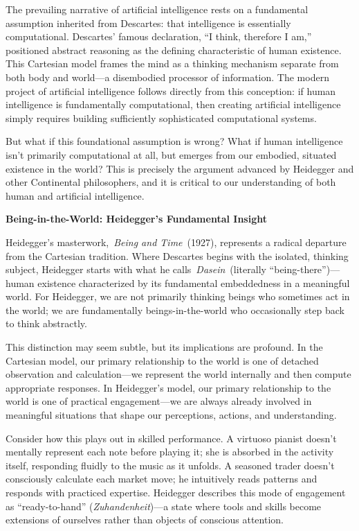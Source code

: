 \documentclass[
  Letterpaper,
]{scrbook}
\begin{document}
The prevailing narrative of artificial intelligence rests on a
fundamental assumption inherited from Descartes: that intelligence is
essentially computational. Descartes' famous declaration, ``I think,
therefore I am,'' positioned abstract reasoning as the defining
characteristic of human existence. This Cartesian model frames the mind
as a thinking mechanism separate from both body and world---a
disembodied processor of information. The modern project of artificial
intelligence follows directly from this conception: if human
intelligence is fundamentally computational, then creating artificial
intelligence simply requires building sufficiently sophisticated
computational systems.

But what if this foundational assumption is wrong? What if human
intelligence isn't primarily computational at all, but emerges from our
embodied, situated existence in the world? This is precisely the
argument advanced by Heidegger and other Continental philosophers, and
it is critical to our understanding of both human and artificial
intelligence.

\textbf{Being-in-the-World: Heidegger's Fundamental Insight}

Heidegger's masterwork,~\emph{Being and Time}~(1927), represents a
radical departure from the Cartesian tradition. Where Descartes begins
with the isolated, thinking subject, Heidegger starts with what he
calls~\emph{Dasein}~(literally ``being-there'')---human existence
characterized by its fundamental embeddedness in a meaningful world. For
Heidegger, we are not primarily thinking beings who sometimes act in the
world; we are fundamentally beings-in-the-world who occasionally step
back to think abstractly.

This distinction may seem subtle, but its implications are profound. In
the Cartesian model, our primary relationship to the world is one of
detached observation and calculation---we represent the world internally
and then compute appropriate responses. In Heidegger's model, our
primary relationship to the world is one of practical engagement---we
are always already involved in meaningful situations that shape our
perceptions, actions, and understanding.

Consider how this plays out in skilled performance. A virtuoso pianist
doesn't mentally represent each note before playing it; she is absorbed
in the activity itself, responding fluidly to the music as it unfolds. A
seasoned trader doesn't consciously calculate each market move; he
intuitively reads patterns and responds with practiced expertise.
Heidegger describes this mode of engagement as ``ready-to-hand''
(\emph{Zuhandenheit})---a state where tools and skills become extensions
of ourselves rather than objects of conscious attention.
\end{document}
